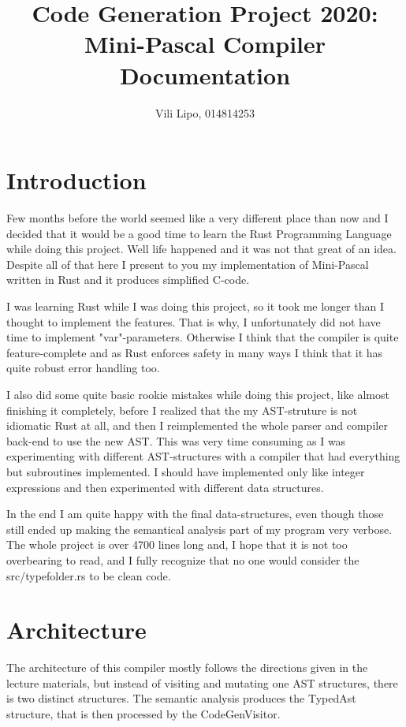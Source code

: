 \documentclass[12pt,a4paper]{article}
\author{Vili Lipo, 014814253}
\title{Code Generation Project 2020: Mini-Pascal Compiler Documentation}
\begin{document}
\maketitle{}
\section{Introduction}

Few months before the world seemed like a very different place than now and I
decided that it would be a good time to learn the Rust Programming Language
while doing this project. Well life happened and it was not that great of an
idea. Despite all of that here I present to you my implementation of Mini-Pascal
written in Rust and it produces simplified C-code.

I was learning Rust while I was doing this project, so  it took me longer
than I thought to implement the features. That is why, I unfortunately did not
have time to implement "var"-parameters. Otherwise I think that
the compiler is quite feature-complete and as Rust enforces safety in many
ways I think that it has quite robust error handling too.

I also did some quite basic rookie mistakes while doing this project, like
almost finishing it completely, before I realized that the my AST-struture is
not idiomatic Rust at all, and then I reimplemented the whole parser and
compiler back-end to use the new AST.  This was very time consuming as I was
experimenting with different AST-structures with a compiler that had everything
but subroutines implemented.  I should have implemented only like integer
expressions and then experimented with different data structures.

In the end I am quite happy with the final data-structures, even though those
still ended up making the semantical analysis part of my program very verbose.
The whole project is over 4700 lines long and, I hope that it is not too
overbearing to read, and I fully recognize that no one would consider the
src/typefolder.rs to be clean code.

\section{Architecture}
The architecture of this compiler mostly follows the directions
given in the lecture materials, but instead of visiting and mutating
one AST structures, there is two distinct structures. The semantic
analysis produces the TypedAst structure, that is then
processed by the CodeGenVisitor.
\end{document}
